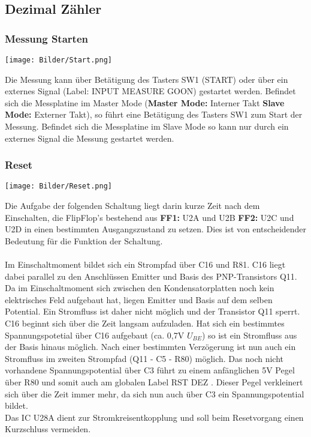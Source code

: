 \documentclass[a4paper,11pt]{scrartcl}
\begin{document}
\newpage

\subsection{Dezimal Zähler}

\subsubsection{Messung Starten}

\begin{center}
\texttt{[image: Bilder/Start.png]}
\end{center}

Die Messung kann über Betätigung des Tasters SW1 (START) oder über ein externes Signal (Label: INPUT MEASURE GOON) gestartet werden. Befindet sich die Messplatine im \glqq Master Mode \grqq{} (\textbf{Master Mode:}  Interner Takt \textbf{Slave Mode:} Externer Takt), so führt eine Betätigung des Tasters SW1 zum Start der Messung.  Befindet sich die Messplatine im \glqq Slave Mode \grqq{} so kann nur durch ein externes Signal die Messung gestartet werden.


\subsubsection{Reset}

\begin{center}
\texttt{[image: Bilder/Reset.png]}
\end{center}

Die Aufgabe der folgenden Schaltung liegt darin kurze Zeit nach dem Einschalten, die FlipFlop's bestehend aus \textbf{FF1:} U2A und U2B \textbf{FF2:} U2C und U2D in einen bestimmten Ausgangszustand zu setzen. Dies ist von entscheidender Bedeutung für die Funktion der Schaltung. 
\\
\\
Im Einschaltmoment bildet sich ein Strompfad über C16 und R81. C16 liegt dabei parallel zu den Anschlüssen \glqq Emitter und Basis\grqq{} des PNP-Transistors Q11. Da im Einschaltmoment sich zwischen den Kondensatorplatten noch kein elektrisches Feld aufgebaut hat, liegen Emitter und Basis auf dem selben Potential. Ein Stromfluss ist daher nicht möglich und der Transistor Q11 sperrt. C16 beginnt sich über die Zeit langsam aufzuladen. Hat sich ein bestimmtes Spannungspotetial über C16 aufgebaut (ca. 0,7V $U_{BE}$) so ist ein Stromfluss aus der Basis hinaus möglich. Nach einer bestimmten Verzögerung ist nun auch ein Stromfluss im zweiten Strompfad (Q11 - C5 - R80) möglich. Das noch nicht vorhandene Spannungspotential über C3 führt zu einem anfänglichen 5V Pegel über R80 und somit auch am globalen Label \glqq RST DEZ \grqq{}. Dieser Pegel verkleinert sich über die Zeit immer mehr, da sich nun auch über C3 ein Spannungspotential bildet. 
\\
Das IC U28A dient zur Stromkreisentkopplung und soll beim Resetvorgang einen Kurzschluss vermeiden.
\end{document}
